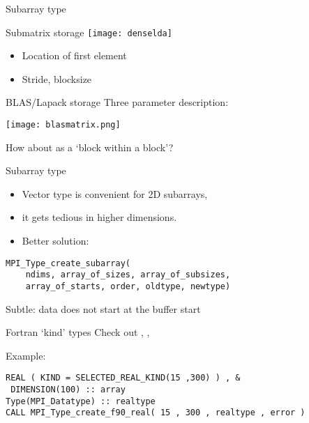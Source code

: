  {Subarray type}

\begin{numberedframe}{Submatrix storage}
  \texttt{[image: denselda]}

  \begin{itemize}
  \item Location of first element
  \item Stride, blocksize
  \end{itemize}
\end{numberedframe}


\begin{numberedframe}{BLAS/Lapack storage}
  Three parameter description:

  \texttt{[image: blasmatrix.png]}

  How about as a `block within a block'?
\end{numberedframe}

\begin{numberedframe}{Subarray type}
  \begin{itemize}
  \item Vector type is convenient for 2D subarrays,
  \item it gets tedious in higher dimensions.
  \item Better solution: 
  \end{itemize}
\begin{lstlisting}
MPI_Type_create_subarray(
    ndims, array_of_sizes, array_of_subsizes,
    array_of_starts, order, oldtype, newtype)  
\end{lstlisting}
Subtle: data does not start at the buffer start
\end{numberedframe}

\begin{exerciseframe}[cubegather]
  
\end{exerciseframe}

\begin{fortran}
\begin{numberedframe}{Fortran `kind' types}
  Check out
,
,

Example:
\lstset{language=Fortran}
\begin{lstlisting}
REAL ( KIND = SELECTED_REAL_KIND(15 ,300) ) , &
 DIMENSION(100) :: array
Type(MPI_Datatype) :: realtype
CALL MPI_Type_create_f90_real( 15 , 300 , realtype , error )
\end{lstlisting}
\end{numberedframe}
\end{fortran}

